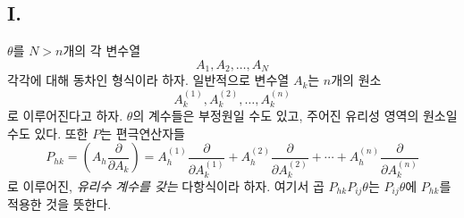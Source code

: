 
\subsection*{I.}
$\theta$를 $N>n$개의 각 변수열
\[
  A_1,A_2,\ldots,A_N
\]
각각에 대해 동차인 형식이라 하자. 일반적으로 변수열 $A_k$는 $n$개의 원소
\[
  A_k^{(1)},A_k^{(2)},\ldots,A_k^{(n)}
\]
로 이루어진다고 하자. $\theta$의 계수들은 부정원일 수도 있고, 주어진 유리성 영역의 원소일 수도 있다. 또한 $P$는 편극연산자들
\[
  P_{hk}=\left(A_h\frac{\partial}{\partial A_k}\right)
  =A_h^{(1)}\frac{\partial}{\partial A_k^{(1)}}+
   A_h^{(2)}\frac{\partial}{\partial A_k^{(2)}}+
   \cdots+
   A_h^{(n)}\frac{\partial}{\partial A_k^{(n)}}
\]
로 이루어진, \emph{유리수 계수를 갖는} 다항식이라 하자. 여기서 곱 $P_{hk}P_{ij}\theta$는 $P_{ij}\theta$에 $P_{hk}$를 적용한 것을 뜻한다.
